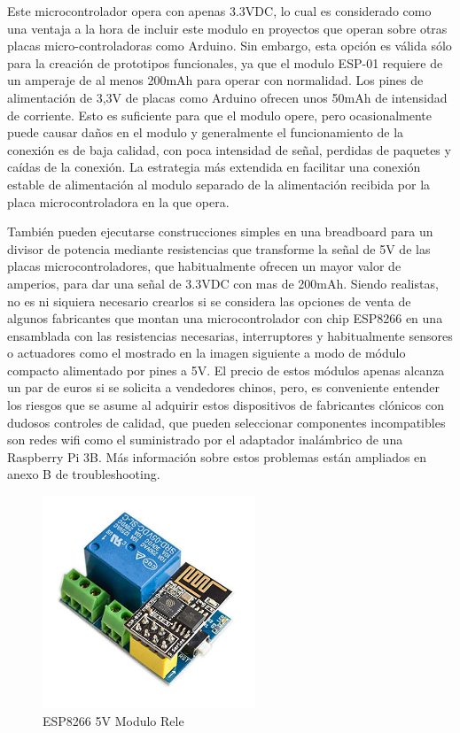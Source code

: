 \vspace{1.5cm}

Este microcontrolador opera con apenas 3.3VDC, lo cual es considerado como una ventaja a la hora de incluir este modulo en proyectos que operan sobre otras placas micro-controladoras como Arduino. Sin embargo, esta opción es válida sólo para la creación de prototipos funcionales, ya que el modulo ESP-01 requiere de un amperaje de al menos 200mAh para operar con normalidad. Los pines de alimentación de 3,3V de placas como Arduino ofrecen unos 50mAh de intensidad de corriente. Esto es suficiente para que el modulo opere, pero ocasionalmente puede causar daños en el modulo y generalmente el funcionamiento de la conexión es de baja calidad, con poca intensidad de señal, perdidas de paquetes y caídas de la conexión. La estrategia más extendida en facilitar una conexión estable de alimentación al modulo separado de la alimentación recibida por la placa microcontroladora en la que opera.

\vspace{1.5cm}

También pueden ejecutarse construcciones simples en una breadboard para un divisor de potencia mediante resistencias que transforme la señal de 5V de las placas microcontroladores, que habitualmente ofrecen un mayor valor de amperios, para dar una señal de 3.3VDC con mas de 200mAh. Siendo realistas, no es ni siquiera necesario crearlos si se considera las opciones de venta de algunos fabricantes que montan una microcontrolador con chip ESP8266 en una ensamblada con las resistencias necesarias, interruptores y habitualmente sensores o actuadores como el mostrado en la imagen siguiente a modo de módulo compacto alimentado por pines a 5V. El precio de estos módulos apenas alcanza un par de euros si se solicita a vendedores chinos, pero, es conveniente entender los riesgos que se asume al adquirir estos dispositivos de fabricantes clónicos con dudosos controles de calidad, que pueden seleccionar componentes incompatibles son redes \gls{wifi} como el suministrado por el adaptador inalámbrico de una Raspberry Pi 3B. Más información sobre estos problemas están ampliados en anexo B de troubleshooting.

\begin{figure}[hbt!]
\centering
\includegraphics[height=2.5in]{figures/esp8266exRele.jpg}
\caption[ESP-01S con rele]{ESP8266 5V Modulo Rele\footnotemark}
\end{figure}


